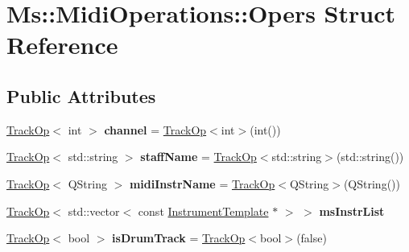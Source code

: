 \hypertarget{struct_ms_1_1_midi_operations_1_1_opers}{}\section{Ms\+:\+:Midi\+Operations\+:\+:Opers Struct Reference}
\label{struct_ms_1_1_midi_operations_1_1_opers}
\subsection*{Public Attributes}
\begin{DoxyCompactItemize}
\item 
\mbox{\label{struct_ms_1_1_midi_operations_1_1_opers_aa32731977a9ba352ac0aa6f0901fa180}} 
\hyperlink{class_ms_1_1_midi_operations_1_1_track_op}{Track\+Op}$<$ int $>$ {\bfseries channel} = \hyperlink{class_ms_1_1_midi_operations_1_1_track_op}{Track\+Op}$<$int$>$(int())
\item 
\mbox{\label{struct_ms_1_1_midi_operations_1_1_opers_ad47f928bf2faee9fe837ccbf9a6a921e}} 
\hyperlink{class_ms_1_1_midi_operations_1_1_track_op}{Track\+Op}$<$ std\+::string $>$ {\bfseries staff\+Name} = \hyperlink{class_ms_1_1_midi_operations_1_1_track_op}{Track\+Op}$<$std\+::string$>$(std\+::string())
\item 
\mbox{\label{struct_ms_1_1_midi_operations_1_1_opers_a14cb2119e1f15cd6598149fd52ff2c3c}} 
\hyperlink{class_ms_1_1_midi_operations_1_1_track_op}{Track\+Op}$<$ Q\+String $>$ {\bfseries midi\+Instr\+Name} = \hyperlink{class_ms_1_1_midi_operations_1_1_track_op}{Track\+Op}$<$Q\+String$>$(Q\+String())
\item 
\hyperlink{class_ms_1_1_midi_operations_1_1_track_op}{Track\+Op}$<$ std\+::vector$<$ const \hyperlink{class_ms_1_1_instrument_template}{Instrument\+Template} $\ast$ $>$ $>$ {\bfseries ms\+Instr\+List}
\item 
\mbox{\label{struct_ms_1_1_midi_operations_1_1_opers_ae16812499f42cc07f786dbf341e3e94a}} 
\hyperlink{class_ms_1_1_midi_operations_1_1_track_op}{Track\+Op}$<$ bool $>$ {\bfseries is\+Drum\+Track} = \hyperlink{class_ms_1_1_midi_operations_1_1_track_op}{Track\+Op}$<$bool$>$(false)
\item 

\end{DoxyCompactItemize}
